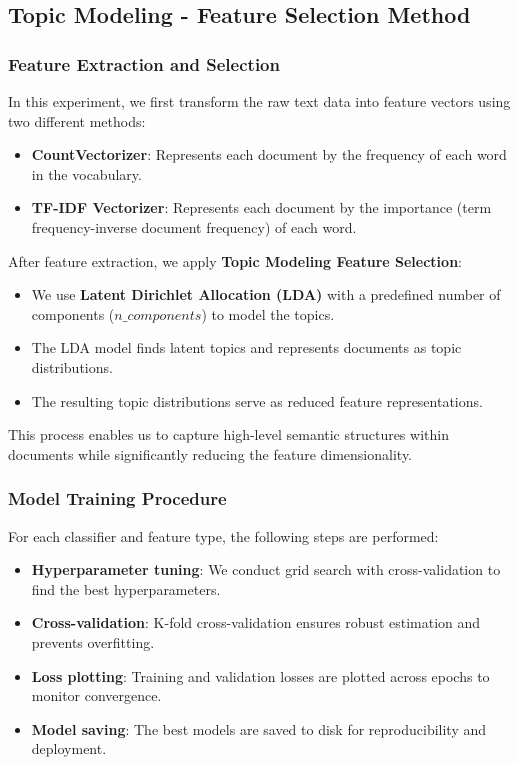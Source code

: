 \subsection{Topic Modeling - Feature Selection Method}

\subsubsection{Feature Extraction and Selection}

In this experiment, we first transform the raw text data into feature vectors using two different methods:
\begin{itemize}
    \item \textbf{CountVectorizer}: Represents each document by the frequency of each word in the vocabulary.
    \item \textbf{TF-IDF Vectorizer}: Represents each document by the importance (term frequency-inverse document frequency) of each word.
\end{itemize}

After feature extraction, we apply \textbf{Topic Modeling Feature Selection}:
\begin{itemize}
    \item We use \textbf{Latent Dirichlet Allocation (LDA)} with a predefined number of components ($n\_components$) to model the topics.
    \item The LDA model finds latent topics and represents documents as topic distributions.
    \item The resulting topic distributions serve as reduced feature representations.
\end{itemize}

This process enables us to capture high-level semantic structures within documents while significantly reducing the feature dimensionality.

\subsubsection{Model Training Procedure}

For each classifier and feature type, the following steps are performed:
\begin{itemize}
    \item \textbf{Hyperparameter tuning}: We conduct grid search with cross-validation to find the best hyperparameters.
    \item \textbf{Cross-validation}: K-fold cross-validation ensures robust estimation and prevents overfitting.
    \item \textbf{Loss plotting}: Training and validation losses are plotted across epochs to monitor convergence.
    \item \textbf{Model saving}: The best models are saved to disk for reproducibility and deployment.
\end{itemize}

